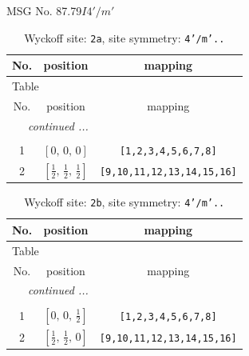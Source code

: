 \documentclass[fleqn,8pt]{jsarticle}
\begin{document}
\setcounter{MaxMatrixCols}{32}

\renewcommand{\tablename}{Table~}
\renewcommand{\figurename}{Figure~}
\begin{center}
\LARGE
MSG No. 87.79\quad$I4'/m'$
\end{center}
\renewcommand{\arraystretch}{1.2}
\begin{longtable}{ccc}
\caption{Wyckoff site: {\tt 2a}, site symmetry: {\tt 4'/m'..}}
 \\
 \hline \hline
No. & position & mapping \\ \hline \endfirsthead

\multicolumn{2}{l}{\tablename\ \thetable{}} \\
 \hline \hline
No. & position & mapping \\ \hline \endhead

 \hline \hline
\multicolumn{2}{r}{\footnotesize\it continued ...} \\ \endfoot

 \hline \hline
\multicolumn{2}{r}{} \\ \endlastfoot

1 & $\left[ 0,\, 0,\, 0 \right]$ & {\tt [1,2,3,4,5,6,7,8]} \\ \hline
2 & $\left[ \frac{1}{2},\, \frac{1}{2},\, \frac{1}{2} \right]$ & {\tt [9,10,11,12,13,14,15,16]} \\
\end{longtable}
\renewcommand{\arraystretch}{1.2}
\begin{longtable}{ccc}
\caption{Wyckoff site: {\tt 2b}, site symmetry: {\tt 4'/m'..}}
 \\
 \hline \hline
No. & position & mapping \\ \hline \endfirsthead

\multicolumn{2}{l}{\tablename\ \thetable{}} \\
 \hline \hline
No. & position & mapping \\ \hline \endhead

 \hline \hline
\multicolumn{2}{r}{\footnotesize\it continued ...} \\ \endfoot

 \hline \hline
\multicolumn{2}{r}{} \\ \endlastfoot

1 & $\left[ 0,\, 0,\, \frac{1}{2} \right]$ & {\tt [1,2,3,4,5,6,7,8]} \\ \hline
2 & $\left[ \frac{1}{2},\, \frac{1}{2},\, 0 \right]$ & {\tt [9,10,11,12,13,14,15,16]} \\
\end{longtable}
\end{document}
